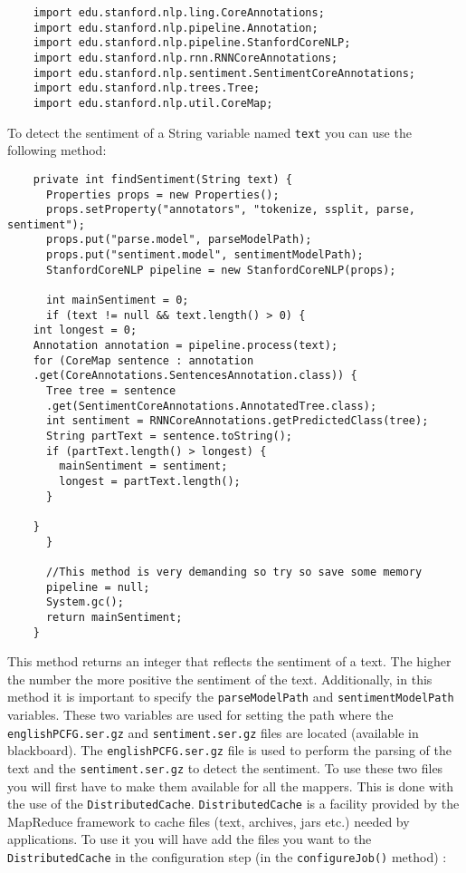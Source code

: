 \documentclass[a4paper,10pt]{article}
\begin{document}
  \begin{lstlisting}
    import edu.stanford.nlp.ling.CoreAnnotations;
    import edu.stanford.nlp.pipeline.Annotation;
    import edu.stanford.nlp.pipeline.StanfordCoreNLP;
    import edu.stanford.nlp.rnn.RNNCoreAnnotations;
    import edu.stanford.nlp.sentiment.SentimentCoreAnnotations;
    import edu.stanford.nlp.trees.Tree;
    import edu.stanford.nlp.util.CoreMap;
  \end{lstlisting}
  
  To detect the sentiment of a String variable named \texttt{text} you can use the following method:
  \begin{lstlisting}
    private int findSentiment(String text) {
      Properties props = new Properties();
      props.setProperty("annotators", "tokenize, ssplit, parse, sentiment");
      props.put("parse.model", parseModelPath);
      props.put("sentiment.model", sentimentModelPath);
      StanfordCoreNLP pipeline = new StanfordCoreNLP(props);
      
      int mainSentiment = 0;
      if (text != null && text.length() > 0) {
	int longest = 0;
	Annotation annotation = pipeline.process(text);
	for (CoreMap sentence : annotation
	.get(CoreAnnotations.SentencesAnnotation.class)) {
	  Tree tree = sentence
	  .get(SentimentCoreAnnotations.AnnotatedTree.class);
	  int sentiment = RNNCoreAnnotations.getPredictedClass(tree);
	  String partText = sentence.toString();
	  if (partText.length() > longest) {
	    mainSentiment = sentiment;
	    longest = partText.length();
	  }
	  
	}
      }
      
      //This method is very demanding so try so save some memory 
      pipeline = null;
      System.gc();
      return mainSentiment;
    }
  \end{lstlisting}
  
  This method returns an integer that reflects the sentiment of a text. The higher the number the more positive the sentiment of the text. Additionally,  in this method it is important to specify the \texttt{parseModelPath} and \texttt{sentimentModelPath} variables. These two variables are used for setting the path where the \texttt{englishPCFG.ser.gz} and \texttt{sentiment.ser.gz} files are located (available in blackboard). The \texttt{englishPCFG.ser.gz} file is used to perform the parsing of the text and the \texttt{sentiment.ser.gz} to detect the sentiment. To use these two files you will first have to make them available for all the mappers. This is done with the use of the \texttt{DistributedCache}. \texttt{DistributedCache} is a facility provided by the MapReduce framework to cache files (text, archives, jars etc.) needed by applications. To use it you will have add the files you want to the \texttt{DistributedCache} in the configuration step (in the \texttt{configureJob()} method) :
  
\end{document}
